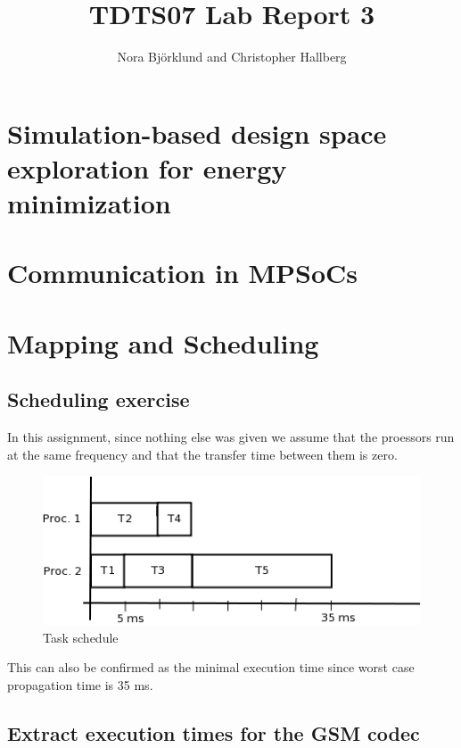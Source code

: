 \documentclass[a4paper, 12pt]{article}
\title{TDTS07 Lab Report 3}
\author{Nora Björklund and Christopher Hallberg}
\begin{document}
\maketitle


\section{Simulation-based design space exploration for energy minimization}
\section{Communication in MPSoCs}
\section{Mapping and Scheduling}
\subsection{Scheduling exercise}
In this assignment, since nothing else was given we assume that the
proessors run at the same frequency and that the transfer time between
them is zero.
\begin{figure}[h]
  \centering
  \includegraphics{taskSchedule.png}
  \caption{Task schedule}
  \label{fig:schedule}
\end{figure}
 This can also be confirmed as the minimal execution time since worst
 case propagation time is 35 ms. 

\subsection{Extract execution times for the GSM codec}
\end{document}
